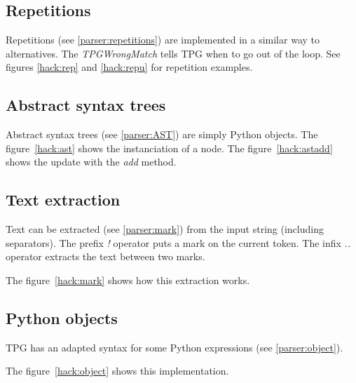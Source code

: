 
\clearpage
\subsection{Repetitions}
\label{hack:repetitions}

Repetitions (see \ref{parser:repetitions}) are implemented in a similar way to alternatives.
The \emph{TPGWrongMatch} tells TPG when to go out of the loop.
See figures \ref{hack:rep} and \ref{hack:repu} for repetition examples.


\clearpage
\subsection{Abstract syntax trees}

Abstract syntax trees (see \ref{parser:AST}) are simply Python objects.
The figure~\ref{hack:ast} shows the instanciation of a node.
The figure~\ref{hack:astadd} shows the update with the \emph{add} method.


\clearpage
\subsection{Text extraction}

Text can be extracted (see \ref{parser:mark}) from the input string (including separators).
The prefix \emph{!} operator puts a mark on the current token.
The infix \emph{..} operator extracts the text between two marks.

The figure~\ref{hack:mark} shows how this extraction works.


\subsection{Python objects}

TPG has an adapted syntax for some Python expressions (see \ref{parser:object}).

The figure~\ref{hack:object} shows this implementation.


